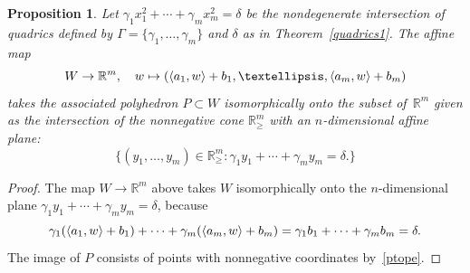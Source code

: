 \documentclass[a4paper]{amsart}
\newtheorem{proposition}[theorem]{Proposition}
\theoremstyle{definition}
\theoremstyle{remark}
\numberwithin{equation}{section}
\def\R{\mathbb R}
\def\R{\mathbb R}
\newcommand{\mb}[1]{{\textbf {\textit#1}}}
\renewcommand{\ge}{\geqslant}
\newcommand{\<}{\langle}
\renewcommand{\>}{\rangle}
\begin{document}
\begin{proposition}\label{ptopepos}
Let $\gamma_1 x^2_1+\cdots+\gamma_mx^2_m=\delta$ be the nondegenerate intersection of quadrics defined by $\Gamma=\{\gamma_1,\ldots,\gamma_m\}$ and $\delta$ as in Theorem~\ref{quadrics1}. The affine map
\[
  W\to\R^m, \quad \mb w\mapsto 
  (\langle\mb a_1,\mb w\rangle+b_1,\ldots,\langle\mb a_m,\mb w\rangle+b_m)
\]
takes the associated polyhedron $P\subset W$ isomorphically onto the subset of~$\R^m$ given as the intersection of the nonnegative cone $\R^m_\ge$ with an $n$-dimensional affine plane:  
\[
  \{(y_1,\ldots,y_m)\in\R_\ge^m\colon
  \gamma_1y_1+\cdots+\gamma_m y_m=\delta.\}
\]
\end{proposition}
\begin{proof}
The map $W\to\R^m$ above takes $W$ isomorphically onto the $n$-dimensional plane 
$\gamma_1y_1+\cdots+\gamma_m y_m=\delta$, because
\[
  \gamma_1(\langle\mb a_1,\mb w\rangle+b_1)+\cdots+
  \gamma_m(\langle\mb a_m,\mb w\rangle+b_m)= \gamma_1b_1+\cdots+
  \gamma_mb_m=\delta.
\]
The image of $P$ consists of points with nonnegative coordinates by~\eqref{ptope}.
\end{proof}
\end{document}
